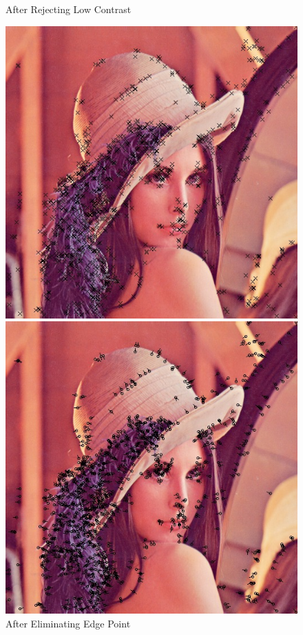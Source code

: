 \begin{enumerate}
\begin{figure}[H]
\begin{minipage}[b]{0.46\linewidth}
        \caption{After Rejecting Low Contrast\label{fig:feature2}}
      \end{minipage}

      \begin{minipage}[b]{0.46\linewidth}
        \centering
        \includegraphics[scale=0.4]{res/feature_point.png}
        \caption{After Eliminating Edge Point\label{fig:feature3}}
      \end{minipage}
      \hspace{1em}
      \begin{minipage}[b]{0.46\linewidth}
        \centering
        \includegraphics[scale=0.4]{res/feature_dir.png}

\end{minipage}
\end{figure}
\end{enumerate}
